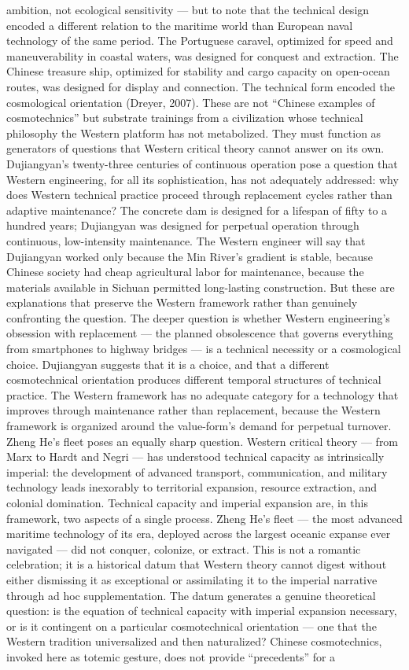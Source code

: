 ambition, not ecological sensitivity — but to note that the technical design encoded a different relation to the maritime world than European naval technology of the same period. The Portuguese caravel, optimized for speed and maneuverability in coastal waters, was designed for conquest and extraction. The Chinese treasure ship, optimized for stability and cargo capacity on open-ocean routes, was designed for display and connection. The technical form encoded the cosmological orientation (Dreyer, 2007). These are not “Chinese examples of cosmotechnics” but substrate trainings from a civilization whose technical philosophy the Western platform has not metabolized. They must function as generators of questions that Western critical theory cannot answer on its own. Dujiangyan’s twenty-three centuries of continuous operation pose a question that Western engineering, for all its sophistication, has not adequately addressed: why does Western technical practice proceed through replacement cycles rather than adaptive maintenance? The concrete dam is designed for a lifespan of fifty to a hundred years; Dujiangyan was designed for perpetual operation through continuous, low-intensity maintenance. The Western engineer will say that Dujiangyan worked only because the Min River’s gradient is stable, because Chinese society had cheap agricultural labor for maintenance, because the materials available in Sichuan permitted long-lasting construction. But these are explanations that preserve the Western framework rather than genuinely confronting the question. The deeper question is whether Western engineering’s obsession with replacement — the planned obsolescence that governs everything from smartphones to highway bridges — is a technical necessity or a cosmological choice. Dujiangyan suggests that it is a choice, and that a different cosmotechnical orientation produces different temporal structures of technical practice. The Western framework has no adequate category for a technology that improves through maintenance rather than replacement, because the Western framework is organized around the value-form’s demand for perpetual turnover. Zheng He’s fleet poses an equally sharp question. Western critical theory — from Marx to Hardt and Negri — has understood technical capacity as intrinsically imperial: the development of advanced transport, communication, and military technology leads inexorably to territorial expansion, resource extraction, and colonial domination. Technical capacity and imperial expansion are, in this framework, two aspects of a single process. Zheng He’s fleet — the most advanced maritime technology of its era, deployed across the largest oceanic expanse ever navigated — did not conquer, colonize, or extract. This is not a romantic celebration; it is a historical datum that Western theory cannot digest without either dismissing it as exceptional or assimilating it to the imperial narrative through ad hoc supplementation. The datum generates a genuine theoretical question: is the equation of technical capacity with imperial expansion necessary, or is it contingent on a particular cosmotechnical orientation — one that the Western tradition universalized and then naturalized? Chinese cosmotechnics, invoked here as totemic gesture, does not provide “precedents” for a 